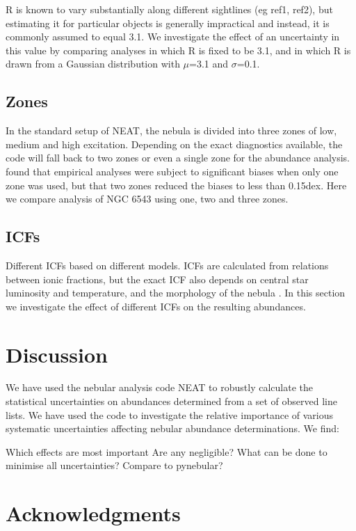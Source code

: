 \documentclass[useAMS,usenatbib]{mn2e}
\begin{document}
R is known to vary substantially along different sightlines (eg ref1, ref2), but estimating it for particular objects is generally impractical and instead, it is commonly assumed to equal 3.1.  We investigate the effect of an uncertainty in this value by comparing analyses in which R is fixed to be 3.1, and in which R is drawn from a Gaussian distribution with $\mu$=3.1 and $\sigma$=0.1.

\subsection{Zones}

In the standard setup of NEAT, the nebula is divided into three zones of low, medium and high excitation.  Depending on the exact diagnostics available, the code will fall back to two zones or even a single zone for the abundance analysis. \citet{2010MNRAS.401.1375E} found that empirical analyses were subject to significant biases when only one zone was used, but that two zones reduced the biases to less than 0.15dex.  Here we compare analysis of NGC 6543 using one, two and three zones.

\subsection{ICFs}

Different ICFs based on different models.  ICFs are calculated from relations between ionic fractions, but the exact ICF also depends on central star luminosity and temperature, and the morphology of the nebula \citep{2011arXiv1110.2709G}.  In this section we investigate the effect of different ICFs on the resulting abundances.

\section{Discussion}

We have used the nebular analysis code NEAT to robustly calculate the statistical uncertainties on abundances determined from a set of observed line lists.  We have used the code to investigate the relative importance of various systematic uncertainties affecting nebular abundance determinations.  We find:

Which effects are most important
Are any negligible?
What can be done to minimise all uncertainties?
Compare to pynebular?

\section*{Acknowledgments}





\label{lastpage}
\end{document}

